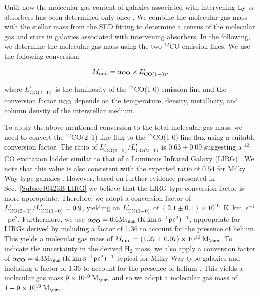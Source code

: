 \documentclass[a4paper,fleqn,usenatbib]{mnras}
\begin{document}
Until now the molecular gas content of galaxies associated with intervening Ly~$\alpha$ absorbers has been determined only once \citep{Neeleman2016first}. We combine the molecular gas mass with the stellar mass from the SED fitting to determine a census of the molecular gas and stars in galaxies associated with intervening absorbers. In the following, we determine the molecular gas mass using the two $^{12}$CO emission lines. We use the following conversion:

\begin{equation}
M_{\rm mol} = \alpha_{\rm CO} \times L'_{\rm CO(1-0)},
\end{equation}

where $L'_{\rm CO(1-0)}$ is the luminosity of the $^{12}$CO(1-0) emission line and the conversion factor $\alpha_{\rm CO}$ depends on the temperature, density, metallicity, and column density of the interstellar medium.


To apply the above mentioned conversion to the total molecular gas mass, we need to convert the $^{12}$CO(2--1) line flux to the $^{12}$CO(1-0) line flux using a suitable conversion factor. The ratio of $L'_{\rm CO(3-2)}/L'_{\rm CO(2-1)}$ is $0.63 \pm 0.09$ suggesting a $^{12}$CO excitation ladder similar to that of a Luminous Infrared Galaxy (LIRG) \mbox{\citep{Papadopoulos2012molecular1}}. We note that this value is also consistent with the expected ratio of $0.54$ for Milky Way-type galaxies \citep{Carilli2013cool}. However, based on further evidence presented in Sec.~\ref{SubsecJ0423B-LIRG} we believe that the LIRG-type conversion factor is more appropriate. Therefore, we adopt a conversion factor of \mbox{$L'_{\rm CO(2-1)}/L'_{\rm CO(1-0)} = 0.9$}, yielding an $L'_{\rm CO(1-0)}$ of \mbox{$(2.1 \pm 0.1) \times 10^{10}$ K km s$^{-1}$ pc$^{2}$}. Furthermore, we use $\alpha_{\rm CO} = 0.6 \rm{M}_{\sun}\: (\rm{K\: km\: s^{-1} pc^2})^{-1}$, appropriate for LIRGs derived by \mbox{\citet{Papadopoulos2012molecular2}} including a factor of 1.36 to account for the presence of helium. This yields a molecular gas mass of \mbox{$M_{\rm mol} = (1.27 \pm 0.07) \times 10^{10} \: \rm{M}_{\sun}$.} To indicate the uncertainty in the derived H$_{2}$ mass, we also apply a conversion factor of $\alpha_{\rm CO} = 4.3 \rm{M}_{\sun}\: (\rm{K \: km\: s^{-1} pc^2})^{-1}$ typical for Milky Way-type galaxies and including a factor of 1.36 to account for the presence of helium \mbox{\citep{Bolatto2013co}}.
This yields a molecular gas mass $9 \times 10^{10}\: \rm{M}_{\sun}$ and so we adopt a molecular gas mass of $1 - 9 \times 10^{10}\: \rm{M}_{\sun}$.\\
\end{document}
